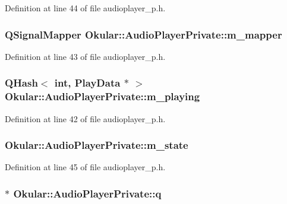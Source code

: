 Definition at line 44 of file audioplayer\+\_\+p.\+h.

\hypertarget{classOkular_1_1AudioPlayerPrivate_ad5a18424521deef41a95b0781d157821}{
\subsubsection[{m\+\_\+mapper}]{\setlength{\rightskip}{0pt plus 5cm}Q\+Signal\+Mapper Okular\+::\+Audio\+Player\+Private\+::m\+\_\+mapper}}\label{classOkular_1_1AudioPlayerPrivate_ad5a18424521deef41a95b0781d157821}


Definition at line 43 of file audioplayer\+\_\+p.\+h.

\hypertarget{classOkular_1_1AudioPlayerPrivate_adbc0d0a9187f39a4be0d8b0e3d96ce68}{
\subsubsection[{m\+\_\+playing}]{\setlength{\rightskip}{0pt plus 5cm}Q\+Hash$<$ int, {\bf Play\+Data} $\ast$ $>$ Okular\+::\+Audio\+Player\+Private\+::m\+\_\+playing}}\label{classOkular_1_1AudioPlayerPrivate_adbc0d0a9187f39a4be0d8b0e3d96ce68}


Definition at line 42 of file audioplayer\+\_\+p.\+h.

\hypertarget{classOkular_1_1AudioPlayerPrivate_a3efa5829a954428660181e223342a12c}{
\subsubsection[{m\+\_\+state}]{ Okular\+::\+Audio\+Player\+Private\+::m\+\_\+state}}\label{classOkular_1_1AudioPlayerPrivate_a3efa5829a954428660181e223342a12c}


Definition at line 45 of file audioplayer\+\_\+p.\+h.

\hypertarget{classOkular_1_1AudioPlayerPrivate_a6f941dd114ab7795d75c5e9a9c49e480}{
\subsubsection[{q}]{$\ast$ Okular\+::\+Audio\+Player\+Private\+::q}}\label{classOkular_1_1AudioPlayerPrivate_a6f941dd114ab7795d75c5e9a9c49e480}


